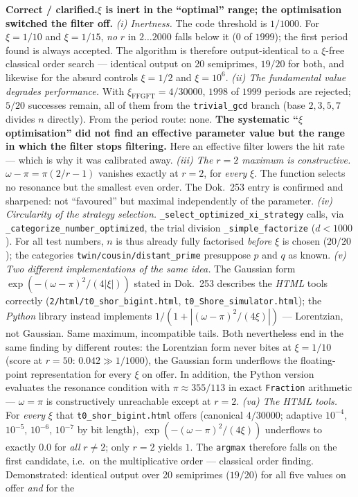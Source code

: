 \smallskip\noindent\textbf{Correct / clarified.}\quad \textbf{$\xi$ is inert in the \enquote{optimal} range; the optimisation   switched the filter off.}   \emph{(i) Inertness.} The code threshold is $1/1000$. For $\xi = 1/10$   and $\xi = 1/15$, \emph{no} $r$ in $2\ldots 2000$ falls below it   ($0$ of $1999$); the first period found is always accepted. The   algorithm is therefore output-identical to a $\xi$-free classical order   search --- identical output on 20 semiprimes, $19/20$ for both, and   likewise for the absurd controls $\xi = 1/2$ and $\xi = 10^6$.   \emph{(ii) The fundamental value degrades performance.} With   $\xi_\text{FFGFT} = 4/30000$, $1998$ of $1999$ periods are rejected;   $5/20$ successes remain, all of them from the \texttt{trivial\_gcd}   branch (base $2,3,5,7$ divides $n$ directly). From the period route:   none. \textbf{The systematic \enquote{$\xi$ optimisation} did not find an   effective parameter value but the range in which the filter stops   filtering.} Here an effective filter lowers the hit rate --- which is   why it was calibrated away.   \emph{(iii) The $r=2$ maximum is constructive.} $\omega - \pi =   \pi(2/r - 1)$ vanishes exactly at $r = 2$, for \emph{every} $\xi$. The   function selects no resonance but the smallest even order. The Dok.~253   entry is confirmed and sharpened: not \enquote{favoured} but maximal   independently of the parameter.   \emph{(iv) Circularity of the strategy selection.}   \texttt{\_\allowbreak select\_\allowbreak optimized\_\allowbreak xi\_\allowbreak strategy} calls, via   \texttt{\_\allowbreak categorize\_\allowbreak number\_\allowbreak optimized}, the trial division   \texttt{\_simple\_factorize} ($d < 1000$). For all test numbers, $n$ is   thus already fully factorised \emph{before} $\xi$ is chosen ($20/20$);   the categories \texttt{twin/\allowbreak cousin/\allowbreak distant\_\allowbreak prime} presuppose $p$ and   $q$ as known.   \emph{(v) Two different implementations of the same idea.}   The Gaussian form $\exp(-(\omega-\pi)^2/(4|\xi|))$ stated in Dok.~253   describes the \emph{HTML} tools correctly   (\texttt{2/html/t0\_shor\_bigint.html},   \texttt{t0\_Shore\_simulator.html}); the \emph{Python} library instead   implements $1/(1 + |(\omega-\pi)^2/(4\xi)|)$ --- Lorentzian, not   Gaussian. Same maximum, incompatible tails. Both nevertheless end in the   same finding by different routes: the Lorentzian form never bites at   $\xi = 1/10$ (score at $r = 50$: $0.042 \gg 1/1000$), the Gaussian form   underflows the floating-point representation for every $\xi$ on offer.   In addition, the Python version evaluates the resonance condition with   $\pi \approx 355/113$ in exact \texttt{Fraction} arithmetic ---   $\omega = \pi$ is constructively unreachable except at $r = 2$.   \emph{(va) The HTML tools.} For \emph{every} $\xi$ that   \texttt{t0\_shor\_bigint.html} offers (canonical $4/30000$; adaptive   $10^{-4}$, $10^{-5}$, $10^{-6}$, $10^{-7}$ by bit length),   $\exp(-(\omega-\pi)^2/(4\xi))$ underflows to exactly $0.0$ for   \emph{all} $r \neq 2$; only $r = 2$ yields $1$. The \texttt{argmax}   therefore falls on the first candidate, i.e.\ on the multiplicative   order --- classical order finding. Demonstrated: identical output over   20 semiprimes ($19/20$) for all five values on offer \emph{and} for the   